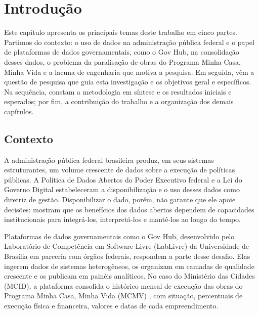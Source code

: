 \chapter[Introdução]{Introdução}
\label{cap:introducao}

Este capítulo apresenta os principais temas deste trabalho em cinco partes. Partimos do contexto: o uso de dados na administração pública federal e o papel de plataformas de dados governamentais, como o Gov Hub, na consolidação desses dados, o problema da paralisação de obras do Programa Minha Casa, Minha Vida e a lacuna de engenharia que motiva a pesquisa. Em seguida, vêm a questão de pesquisa que guia esta investigação e os objetivos geral e específicos. Na sequência, constam a metodologia em síntese e os resultados iniciais e esperados; por fim, a contribuição do trabalho e a organização dos demais capítulos.

\section{Contexto}

A administração pública federal brasileira produz, em seus sistemas estruturantes, um volume crescente de dados sobre a execução de políticas públicas. A Política de Dados Abertos do Poder Executivo federal \cite{brasil2016dadosabertos} e a Lei do Governo Digital \cite{brasil2021governodigital} estabeleceram a disponibilização e o uso desses dados como diretriz de gestão. Disponibilizar o dado, porém, não garante que ele apoie decisões:  mostram que os benefícios dos dados abertos dependem de capacidades institucionais para integrá-los, interpretá-los e mantê-los ao longo do tempo.

Plataformas de dados governamentais como o Gov Hub, desenvolvido pelo Laboratório de Competência em Software Livre (LabLivre) da Universidade de Brasília em parceria com órgãos federais, respondem a parte desse desafio. Elas ingerem dados de sistemas heterogêneos, os organizam em camadas de qualidade crescente e os publicam em painéis analíticos. No caso do Ministério das Cidades (MCID), a plataforma consolida o histórico mensal de execução das obras do Programa Minha Casa, Minha Vida (MCMV) \cite{brasil2023mcmv}, com situação, percentuais de execução física e financeira, valores e datas de cada empreendimento.

